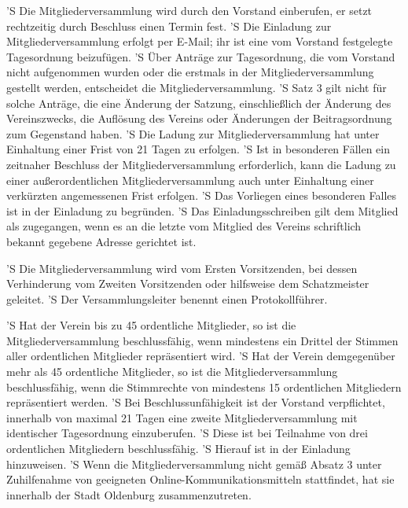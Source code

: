\documentclass[a4paper,10pt]{scrreprt}
\begin{document}
\begin{contract}
'S Die Mitgliederversammlung wird durch den Vorstand einberufen, er setzt
rechtzeitig durch Beschluss einen Termin fest.
'S Die Einladung zur Mitgliederversammlung erfolgt per E-Mail; ihr ist eine vom
Vorstand festgelegte Tagesordnung beizufügen.
'S Über Anträge zur Tagesordnung, die vom Vorstand nicht aufgenommen wurden
oder die erstmals in der Mitgliederversammlung gestellt werden, entscheidet die
Mitgliederversammlung.
'S Satz 3 gilt nicht für solche Anträge, die eine Änderung der Satzung,
einschließlich der Änderung des Vereinszwecks, die Auflösung des Vereins oder
Änderungen der Beitragsordnung zum Gegenstand haben.
'S Die Ladung zur Mitgliederversammlung hat unter Einhaltung einer Frist von 21
Tagen zu erfolgen.
'S Ist in besonderen Fällen ein zeitnaher Beschluss der Mitgliederversammlung
erforderlich, kann die Ladung zu einer außerordentlichen Mitgliederversammlung
auch unter Einhaltung einer verkürzten angemessenen Frist erfolgen.
'S Das Vorliegen eines besonderen Falles ist in der Einladung zu begründen.
'S Das Einladungsschreiben gilt dem Mitglied als zugegangen, wenn es an die
letzte vom Mitglied des Vereins schriftlich bekannt gegebene Adresse gerichtet
ist.

'S Die Mitgliederversammlung wird vom Ersten Vorsitzenden, bei dessen
Verhinderung vom Zweiten Vorsitzenden oder hilfsweise dem Schatzmeister
geleitet.
'S Der Versammlungsleiter benennt einen Protokollführer.

'S Hat der Verein bis zu 45 ordentliche Mitglieder, so ist die
Mitgliederversammlung beschlussfähig, wenn mindestens ein Drittel der Stimmen
aller ordentlichen Mitglieder repräsentiert wird.
'S Hat der Verein demgegenüber mehr als 45 ordentliche Mitglieder, so ist die
Mitgliederversammlung beschlussfähig, wenn die Stimmrechte von mindestens 15
ordentlichen Mitgliedern repräsentiert werden.
'S Bei Beschlussunfähigkeit ist der Vorstand verpflichtet, innerhalb von
maximal 21 Tagen eine zweite Mitgliederversammlung mit identischer Tagesordnung
einzuberufen.
'S Diese ist bei Teilnahme von drei ordentlichen Mitgliedern beschlussfähig.
'S Hierauf ist in der Einladung hinzuweisen.
'S Wenn die Mitgliederversammlung nicht gemäß Absatz 3 unter Zuhilfenahme von
geeigneten Online-Kommunikationsmitteln stattfindet, hat sie innerhalb der
Stadt Oldenburg zusammenzutreten.


\end{contract}
\end{document}
